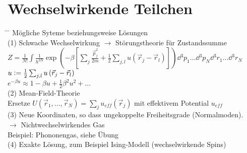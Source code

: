 \section{Wechselwirkende Teilchen}
\begin{tabbing}
\hspace{4em} \= \hspace{4em} \= \kill
Mögliche Syteme beziehungsweise Lösungen\\
(1)\> Schwache Wechselwirkung $\rightarrow$ Störungstheorie für Zustandssumme\\
\> $ Z = \frac{1}{N!}\int \frac{1}{h^{3N}}\exp \left(-\beta\left[\sum_j \frac{\vec{p}^2_j}{2 m} + \frac{1}{2} \sum_{j,l}u\left(\vec{r}_j - \vec{r}_l\right)\right]\right)\dd{}^3 p_1\dots \dd{}^3 p_N \dd{}^3 r_1\dots \dd{}^3 r_N$\\
\> $u \vcentcolon  = \frac{1}{2} \sum_{j,l}u\left(\vec{r}_j - \vec{r}_l\right)$\\
\> $e^{-\beta u} \approx 1 - \beta u + \frac{1}{2} \beta^2 u^2 + \dots$\\
(2)\> Mean-Field-Theorie\\
\> Ersetze $U\left(\vec{r}_1, \dots, \vec{r}_N\right) = \sum\limits_j u_{eff} \left(\vec{r}_j\right)$ mit effektivem Potential $u_{eff}$\\
(3)\> Neue Koordinaten, so dass ungekoppelte Freiheitsgrade (Normalmoden).\\
\> $\rightarrow$ Nichtwechselwirkendes Gas\\
\>Beispiel: Phononengas, siehe Übung\\
(4)\> Exakte Lösung, zum Beispiel Ising-Modell (wechselwirkende Spins)
\end{tabbing}


